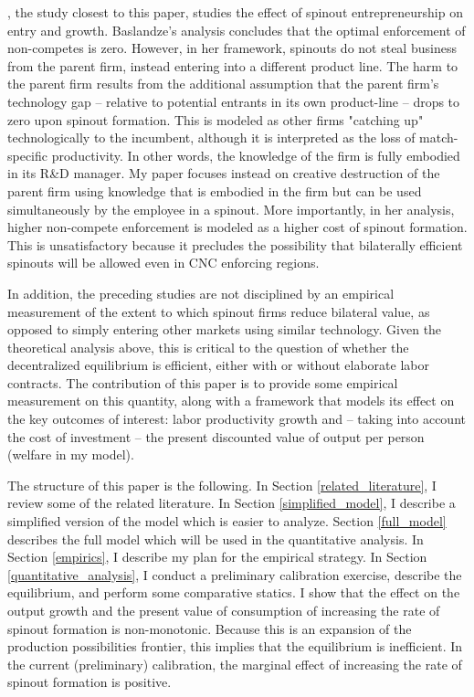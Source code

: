 \documentclass[12pt,english]{article}
\theoremstyle{remark}
\begin{document}
\cite{baslandze_spinout_2019}, the study closest to this paper, studies the effect of spinout entrepreneurship on entry and growth. Baslandze's analysis concludes that the optimal enforcement of non-competes is zero. However, in her framework, spinouts do not steal business from the parent firm, instead entering into a different product line. The harm to the parent firm results from the additional assumption that the parent firm's technology gap -- relative to potential entrants in its own product-line -- drops to zero upon spinout formation. This is modeled as other firms "catching up" technologically to the incumbent, although it is interpreted as the loss of match-specific productivity. In other words, the knowledge of the firm is fully embodied in its R\&D manager. My paper focuses instead on creative destruction of the parent firm using knowledge that is embodied in the firm but can be used simultaneously by the employee in a spinout.  More importantly, in her analysis, higher non-compete enforcement is modeled as a higher cost of spinout formation. This is unsatisfactory because it precludes the possibility that bilaterally efficient spinouts will be allowed even in CNC enforcing regions. 

In addition, the preceding studies are not disciplined by an empirical measurement of the extent to which spinout firms reduce bilateral value, as opposed to simply entering other markets using similar technology. Given the theoretical analysis above, this is critical to the question of whether the decentralized equilibrium is efficient, either with or without elaborate labor contracts. The contribution of this paper is to provide some empirical measurement on this quantity, along with a framework that models its effect on the key outcomes of interest: labor productivity growth and -- taking into account the cost of investment -- the present discounted value of output per person (welfare in my model).

The structure of this paper is the following. In Section \ref{related_literature}, I review some of the related literature. In Section \ref{simplified_model}, I describe a simplified version of the model which is easier to analyze. Section \ref{full_model} describes the full model which will be used in the quantitative analysis. In Section \ref{empirics}, I describe my plan for the empirical strategy. In Section \ref{quantitative_analysis}, I conduct a preliminary calibration exercise, describe the equilibrium, and perform some comparative statics. I show that the effect on the output growth and the present value of consumption of increasing the rate of spinout formation is non-monotonic. Because this is an expansion of the production possibilities frontier, this implies that the equilibrium is inefficient. In the current (preliminary) calibration, the marginal effect of increasing the rate of spinout formation is positive. 
\end{document}
